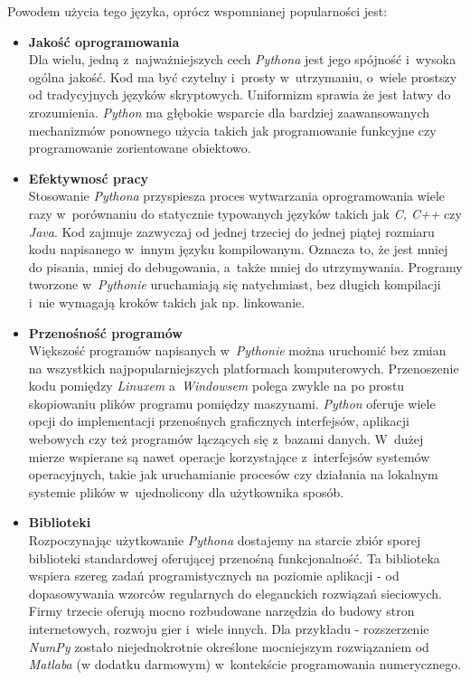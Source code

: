 \documentclass[a4paper,12pt,oneside]{mwrep}  %
\begin{document}
Powodem użycia tego języka, oprócz wspomnianej popularności jest:
\begin{itemize}
\item \textbf{Jakość oprogramowania}\\
Dla wielu, jedną z~najważniejszych cech \emph{Pythona} jest jego spójność i~wysoka ogólna jakość. Kod ma być czytelny i~prosty w~utrzymaniu, o~wiele prostszy od tradycyjnych języków skryptowych. Uniformizm sprawia że jest łatwy do zrozumienia. \emph{Python} ma głębokie wsparcie dla bardziej zaawansowanych mechanizmów ponownego użycia takich jak programowanie funkcyjne czy programowanie zorientowane obiektowo.

\item \textbf{Efektywnosć pracy}\\
Stosowanie \emph{Pythona} przyspiesza proces wytwarzania oprogramowania wiele razy w~porównaniu do statycznie typowanych języków takich jak \emph{C, C++} czy \emph{Java}. Kod zajmuje zazwyczaj od jednej trzeciej do jednej piątej rozmiaru kodu napisanego w~innym języku kompilowanym. Oznacza to, że jest mniej do pisania, mniej do debugowania, a~także mniej do utrzymywania. Programy tworzone w~\emph{Pythonie} uruchamiają się natychmiast, bez długich kompilacji i~nie wymagają kroków takich jak np. linkowanie.

\item \textbf{Przenośność programów}\\
Większość programów napisanych w~\emph{Pythonie} można uruchomić bez zmian na wszystkich najpopularniejszych platformach komputerowych. Przenoszenie kodu pomiędzy \emph{Linuxem} a~\emph{Windowsem} polega zwykle na po prostu skopiowaniu plików programu pomiędzy maszynami. \emph{Python} oferuje wiele opcji do implementacji przenośnych graficznych interfejsów, aplikacji webowych czy też programów łączących się z~bazami danych. W~dużej mierze wspierane są nawet operacje korzystające z~interfejsów systemów operacyjnych, takie jak uruchamianie procesów czy działania na lokalnym systemie plików w~ujednolicony dla użytkownika sposób.

\item \textbf{Biblioteki}\\
Rozpoczynając użytkowanie \emph{Pythona} dostajemy na starcie zbiór sporej biblioteki standardowej oferującej przenośną funkcjonalność. Ta biblioteka wspiera szereg zadań programistycznych na poziomie aplikacji - od dopasowywania wzorców regularnych do eleganckich rozwiązań sieciowych. Firmy trzecie oferują mocno rozbudowane narzędzia do budowy stron internetowych, rozwoju gier i~wiele innych. Dla przykładu - rozszerzenie \emph{NumPy} zostało niejednokrotnie określone mocniejszym rozwiązaniem od \emph{Matlaba} (w dodatku darmowym) w~kontekście programowania numerycznego.


\end{itemize}
\end{document}
